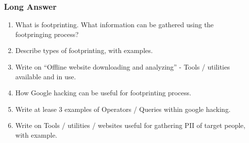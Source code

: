 \subsubsection{Long Answer}
\begin{enumerate}
    \item What is footprinting. What information can be gathered using the footpringing process?
    \item Describe types of footprinting, with examples.
    \item Write on \enquote{Offline website downloading and analyzing} - Tools / utilities available and in use.
    \item How Google hacking can be useful for footprinting process.
    \item Write at lease 3 examples of Operators / Queries within google hacking.
    \item Write on Tools / utilities / websites useful for gathering PII of target people, with example.
\end{enumerate}
